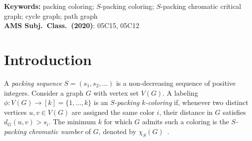 \documentclass[12pt]{article}
\begin{document}
 \begin{abstract}
Let $S=(s_1,s_2,\ldots)$ be a non-decreasing sequence of positive integers. For a graph $G$ with vertex set $V(G)$, a labeling 
$\phi \colon V(G)\to \{1,\ldots,k\}$ is an $S$-packing $k$-coloring 
if, whenever two distinct vertices $u,v\in V(G)$ are assigned the same color $i$, their distance in $G$ is greater than $s_i$. 
The minimum $k$ for which $G$ admits such a coloring is the 
 $S$-packing chromatic number of $G$. A graph $G$ is $\chi_S$-vertex-critical if $\chi_S(G-v) < \chi_S(G)$ for every $v \in V(G)$, and it is $\chi_S$-critical if $\chi_S(H) < \chi_S(G)$ holds for every proper subgraph $H$ of $G$.
In this paper, the exact value of $\chi_S(P_n)$ is determined for every path of order $n$ and for every packing sequence $S$ where $s_i < 2^i$ holds for each entry $s_i$. As a consequence, $\chi_S$-critical and $\chi_S$-vertex-critical paths are identified for each such sequence $S$.
In addition, we extend earlier results on $\chi_S$-critical cycles and provide a complete characterization of $\chi_S$-critical and $\chi_S$-vertex-critical cycles for packing sequences $S= (1, s_2, \dots )$ with $s_2 \in \{2,3\}$ and $s_3,s_4 \in \{4,5,6,7\}$.


 \end{abstract}
 \noindent
{\bf Keywords:} packing coloring; $S$-packing coloring; $S$-packing chromatic critical graph;  cycle graph; path graph  \\

\noindent
{\bf AMS Subj.\ Class.\ (2020)}: 05C15, 05C12

\section{Introduction} \label{sec:intro}

 A \emph{packing sequence} $S=(s_1,s_2,\ldots)$ is a non-decreasing sequence of positive integers. Consider a graph $G$ with vertex set $V(G)$. A labeling 
$\phi \colon V(G)\to [k]=\{1,\ldots,k\}$ is an {\em $S$-packing $k$-coloring} 
if, whenever two distinct vertices $u,v\in V(G)$ are assigned the same color $i$, their distance in $G$ satisfies $d_G(u,v)>s_i$. 
The minimum $k$ for which $G$ admits such a coloring is the 
{\em $S$-packing chromatic number} of $G$, denoted by $\chi_S(G)$~\cite{goddard-2012}.
\end{document}
